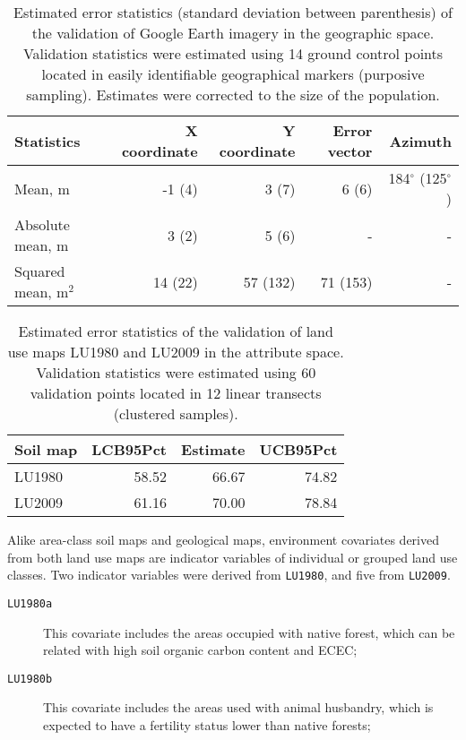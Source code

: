 \begin{table}[ht]
\caption{Estimated error statistics (standard deviation between parenthesis) of the validation of Google Earth imagery in the geographic space. Validation statistics were estimated using 14 ground control points located in easily identifiable geographical markers (purposive sampling). Estimates were corrected to the size of the population.}
\label{tab:google-geo-val}
\centering
{\small
\begin{tabular}{lrrrr}
\hline
Statistics           & X coordinate & Y coordinate & Error vector  & Azimuth                   \\
\hline
Mean, m              & -1 (4)       & 3  (7)       & 6  (6)        & 184$^\circ$ (125$^\circ$) \\ 
Absolute mean, m     & 3  (2)       & 5  (6)       & -             & -                         \\ 
Squared mean, m$^2$  & 14 (22)      & 57 (132)     & 71 (153)      & -                         \\ 
\hline
\end{tabular}}
\end{table}

\begin{table}[ht]
\caption{Estimated error statistics of the validation of land use maps LU1980 and LU2009 in the attribute space. Validation statistics were estimated using 60 validation points located in 12 linear transects (clustered samples).}
\label{tab:land-attr-val}
\centering
{\small
\begin{tabular}{lrrr}
\hline
Soil map     & LCB95Pct & Estimate & UCB95Pct \\
\hline
LU1980       & 58.52    & 66.67    & 74.82    \\
LU2009       & 61.16    & 70.00    & 78.84    \\
\hline
\end{tabular}}
\end{table}

Alike area-class soil maps and geological maps, environment covariates derived from both land use maps are indicator variables of individual or grouped land use classes. Two indicator variables were derived from \texttt{LU1980}, and five from \texttt{LU2009}.

\begin{description}
  \item[\texttt{LU1980a}] This covariate includes the areas occupied with native forest, which can be related with high soil organic carbon content and ECEC;
  
  \item[\texttt{LU1980b}] This covariate includes the areas used with animal husbandry, which is expected to have a fertility status lower than native forests;
\end{description}


